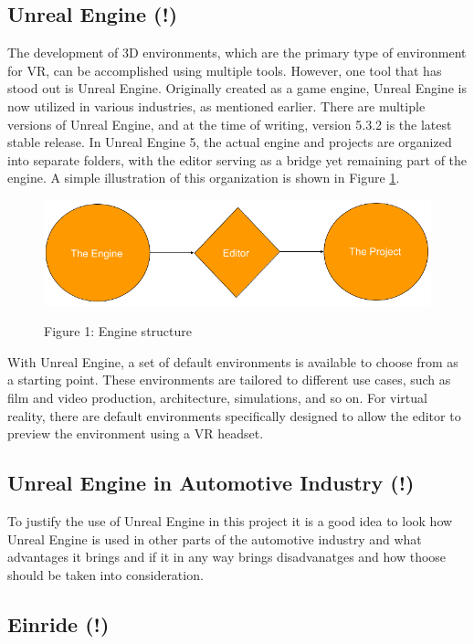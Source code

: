 \subsection{Unreal Engine (!)}
The development of 3D environments, which are the primary type of environment for VR, can be accomplished 
using multiple tools. However, one tool that has stood out is Unreal Engine. Originally created as a game 
engine, Unreal Engine is now utilized in various industries, as mentioned earlier. There are multiple 
versions of Unreal Engine, and at the time of writing, version 5.3.2 is the latest stable release. In 
Unreal Engine 5, the actual engine and projects are organized into separate folders, with the editor 
serving as a bridge yet remaining part of the engine. A simple illustration of this organization is 
shown in Figure \ref{figure 1}.
\begin{figure}
    \includegraphics[width=1.0\textwidth]{SimpleEngineToProject.png}
    \centering
    \label{figure 1}
    \caption[short]{Figure 1: Engine structure}
\end{figure}
\newline \newline
With Unreal Engine, a set of default environments is available to choose from as a starting point. 
These environments are tailored to different use cases, such as film and video production, 
architecture, simulations, and so on. For virtual reality, there are default environments 
specifically designed to allow the editor to preview the environment using a VR headset.

\subsection{Unreal Engine in Automotive Industry (!)}
To justify the use of Unreal Engine in this project it is a good idea to look how Unreal Engine is used in 
other parts of the automotive industry and what advantages it brings and if it in any way brings disadvanatges
and how thoose should be taken into consideration. 
\newline \newline

\subsection{Einride (!)}
